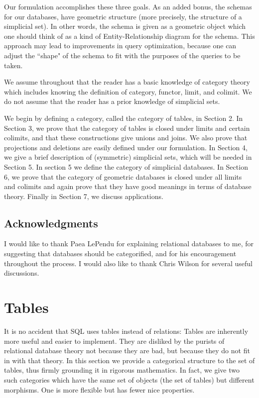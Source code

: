\documentclass{amsart}
\begin{document}
Our formulation accomplishes these three goals.  As an added bonus, the schemas for our databases, have geometric structure (more precisely, the structure of a simplicial set).  In other words, the schema is given as a geometric object which one should think of as a kind of Entity-Relationship diagram for the schema.  This approach may lead to improvements in query optimization, because one can adjust the ``shape" of the schema to fit with the purposes of the queries to be taken.

We assume throughout that the reader has a basic knowledge of category theory which includes knowing the definition of category, functor, limit, and colimit.  We do not assume that the reader has a prior knowledge of simplicial sets.

We begin by defining a category, called the category of tables, in Section 2.  In Section 3, we prove that the category of tables is closed under limits and certain colimits, and that these constructions give unions and joins.  We also prove that projections and deletions are easily defined under our formulation.  In Section 4, we give a brief description of (symmetric) simplicial sets, which will be needed in Section 5.  In section 5 we define the category of simplicial databases.  In Section 6, we prove that the category of geometric databases is closed under all limits and colimits and again prove that they have good meanings in terms of database theory.  Finally in Section 7, we discuss applications.

\subsection{Acknowledgments}

I would like to thank Paea LePendu for explaining relational databases to me, for suggesting that databases should be categorified, and for his encouragement throughout the process.  I would also like to thank Chris Wilson for several useful discussions.

\section{Tables}

It is no accident that SQL uses tables instead of relations: Tables are inherently more useful and easier to implement.  They are disliked by the purists of relational database theory not because they are bad, but because they do not fit in with that theory.  In this section we provide a categorical structure to the set of tables, thus firmly grounding it in rigorous mathematics.  In fact, we give two such categories which have the same set of objects (the set of tables) but different morphisms.  One is more flexible but has fewer nice properties.
\end{document}
